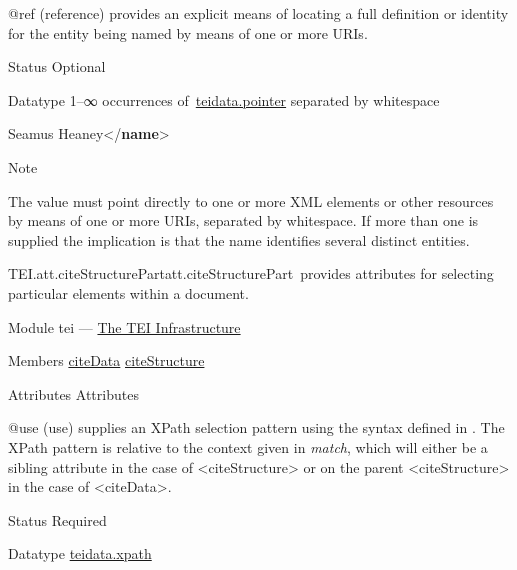 \begin{reflist}
\begin{sansreflist}
\begin{reflist}
\end{reflist}  
    \item[@ref]
  (reference) provides an explicit means of locating a full definition or identity for the entity being named by means of one or more URIs.
\begin{reflist}
    \item[{Status}]
  Optional
    \item[{Datatype}]
  1–∞ occurrences of \hyperref[TEI.teidata.pointer]{teidata.pointer} separated by whitespace
    \item[]Seamus Heaney{</\textbf{name}>}
    \item[{Note}]
  \par
The value must point directly to one or more XML elements or other resources by means of one or more URIs, separated by whitespace. If more than one is supplied the implication is that the name identifies several distinct entities.
\end{reflist}  
\end{sansreflist}  
\end{reflist}  
\begin{reflist}
\item[]\begin{specHead}{TEI.att.citeStructurePart}{att.citeStructurePart} provides attributes for selecting particular elements within a document.\end{specHead} 
    \item[{Module}]
  tei — \hyperref[ST]{The TEI Infrastructure}
    \item[{Members}]
  \hyperref[TEI.citeData]{citeData} \hyperref[TEI.citeStructure]{citeStructure}
    \item[{Attributes}]
  Attributes\hfil\\[-10pt]\begin{sansreflist}
    \item[@use]
  (use) supplies an XPath selection pattern using the syntax defined in \cite{XSLT3}. The XPath pattern is relative to the context given in {\itshape match}, which will either be a sibling attribute in the case of <citeStructure> or on the parent <citeStructure> in the case of <citeData>.
\begin{reflist}
    \item[{Status}]
  Required
    \item[{Datatype}]
  \hyperref[TEI.teidata.xpath]{teidata.xpath}
\end{reflist}  
\end{sansreflist}  
\end{reflist}  
